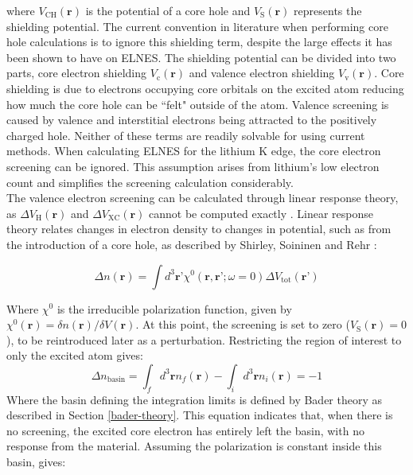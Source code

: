 where $V_{\mathrm{CH}}(\textbf{r})$ is the potential of a core hole and  $V_{\mathrm{S}}(\textbf{r})$ represents the shielding potential.  The current convention in literature when performing core hole calculations is to ignore this shielding term, despite the large effects it has been shown to have on ELNES.  The shielding potential can be divided into two parts, core electron shielding $V_{\mathrm{c}}(\textbf{r})$ and valence electron shielding  $V_{\mathrm{v}}(\textbf{r})$. Core shielding is due to electrons occupying core orbitals on the excited atom reducing how much the core hole can be ``felt" outside of the atom.  Valence screening is caused by valence and interstitial electrons being attracted to the positively charged hole.  Neither of these terms are readily solvable for using current methods.  When calculating ELNES for the lithium K edge, the core electron screening can be ignored.  This assumption arises from lithium's low electron count and simplifies the screening calculation considerably. \\

The valence electron screening can be calculated through linear response theory, as  $\Delta V_{\mathrm{H}}(\textbf{r})$ and $\Delta V_{\mathrm{XC}}(\textbf{r})$ cannot be computed exactly  \cite{shirley_modeling_2005}.  Linear response theory relates changes in electron density to changes in potential, such as from the introduction of a core hole, as described by Shirley, Soininen and Rehr \cite{shirley_modeling_2005}:

\begin{equation}
\Delta n(\textbf{r}) = \int d^3 \textbf{r'} \chi^0(\textbf{r},\textbf{r'}; \omega = 0)\Delta V_{\mathrm{tot}}(\textbf{r'})
\end{equation}

Where $\chi^0$ is the irreducible polarization function, given by $\chi^0(\textbf{r}) = \delta n(\textbf{r}) /  \delta V(\textbf{r})$.  At this point, the screening is set to zero ($V_{\mathrm{S}}(\textbf{r})=0$), to be reintroduced later as a perturbation.  Restricting the region of interest to only the excited atom gives:
\begin{equation}
\Delta n _{\mathrm{basin}} = \int_{f}d^3\textbf{r} n_{f}(\textbf{r}) - \int_{i}d^3\textbf{r} n_i(\textbf{r})= -1
\label{density_calc}
\end{equation}
Where the basin defining the integration limits is defined by Bader theory as described in Section \ref{bader-theory}. This equation indicates that, when there is no screening,  the excited core electron has entirely left the basin, with no response from the material. Assuming  the polarization is constant inside this basin, gives: 

